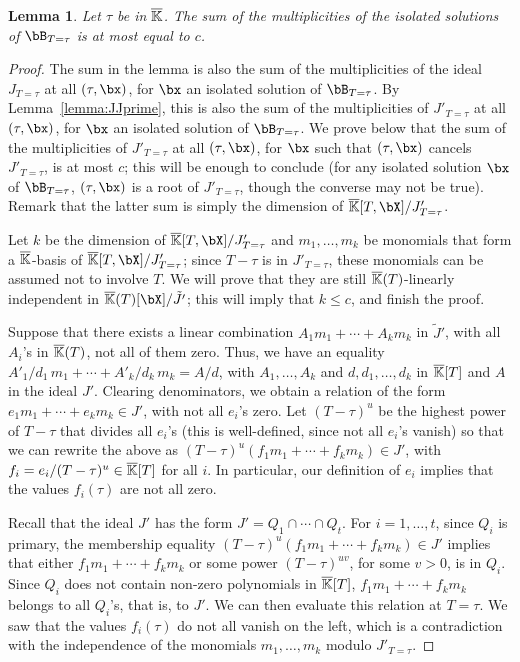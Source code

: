 \documentclass[12pt]{article}
\newtheorem{lemma}[definition]{Lemma}
\begin{document}
 
\begin{lemma}\label{lemma:19}
  Let $\tau$ be in $\overline{\mathbb{K}}$. The sum of the multiplicities of the
  isolated solutions of $\bB_{T=\tau}$ is at most equal to $c$.
\end{lemma}
\begin{proof}
  The sum in the lemma is also the sum of the multiplicities of the
  ideal $J_{T=\tau}$ at all $(\tau,\bx)$, for $\bx$ an isolated solution
  of $\bB_{T=\tau}$.  By Lemma~\ref{lemma:JJprime}, this is also the sum
  of the multiplicities of $J'_{T=\tau}$ at all $(\tau,\bx)$, for $\bx$ an
  isolated solution of $\bB_{T=\tau}$. We prove below that the sum of the
  multiplicities of $J'_{T=\tau}$ at all $(\tau,\bx)$, for $\bx$ such that
  $(\tau,\bx)$ cancels $J'_{T=\tau}$, is at most $c$; this will be enough
  to conclude (for any isolated solution $\bx$ of $\bB_{T=\tau}$,
  $(\tau,\bx)$ is a root of $J'_{T=\tau}$, though the converse may not be
  true). Remark that the latter sum is simply the dimension of
  $\KKbar[T,\bX]/J'_{T=\tau}$.
  
  Let $k$ be the dimension of $\KKbar[T,\bX]/J'_{T=\tau}$ and $m_1,\dots,m_k$ be
  monomials that form a $\overline{\mathbb{K}}$-basis of $\KKbar[T,\bX]/J'_{T=\tau}$; since
  $T-\tau$ is in $J'_{T=\tau}$, these monomials can be assumed not to involve
  $T$. We will prove that they are still $\overline{\mathbb{K}}(T)$-linearly independent in
  $\KKbar(T)[\bX]/\tilde{J'}$; this will imply that $k \le c$, and finish the
  proof.
  
  Suppose that there exists a linear combination $A_1 m_1 + \cdots +
  A_k m_k$ in $\tilde{J}'$, with all $A_i$'s in $\overline{\mathbb{K}}(T)$, not
  all of them zero. Thus, we have an equality $A'_1/d_1\, m_1 + \cdots
  + A'_k/d_k\, m_k = A/d$, with $A_1,\dots,A_k$ and
  $d,d_1,\dots,d_k$ in $\overline{\mathbb{K}}[T]$ and $A$ in the ideal
  $J'$. Clearing denominators, we obtain a relation of the form $e_1
  m_1 +\cdots+ e_k m_k \in J'$, with not all $e_i$'s zero. Let
  $(T-\tau)^u$ be the highest power of $T-\tau$ that divides all
  $e_i$'s (this is well-defined, since not all $e_i$'s vanish) so that
  we can rewrite the above as $(T-\tau)^u (f_1 m_1 +\cdots+ f_k
  m_k) \in J'$, with $f_i=e_i/(T-\tau)^u \in \overline{\mathbb{K}}[T]$ for all $i$.
  In particular, our definition of $e_i$ implies that the values
  $f_i(\tau)$ are not all zero.

  Recall that the ideal $J'$ has the form $J'=Q_1 \cap \cdots \cap
  Q_t$. For $i=1,\dots,t$, since $Q_i$ is primary, the membership
  equality $(T-\tau)^u (f_1 m_1 +\cdots +f_k m_k) \in J'$ implies
  that either $f_1 m_1 +\cdots +f_k m_k$ or some power
  $(T-\tau)^{uv}$, for some $v > 0$, is in $Q_i$. Since $Q_i$ does not
  contain non-zero polynomials in $\overline{\mathbb{K}}[T]$, $f_1 m_1 +\cdots+ f_k
  m_k$ belongs to all $Q_i$'s, that is, to $J'$. We can then
  evaluate this relation at $T=\tau$. We saw that the values
  $f_i(\tau)$ do not all vanish on the left, which is a contradiction
  with the independence of the monomials $m_1,\dots,m_k$ modulo
  $J'_{T=\tau}$.
\end{proof}
\end{document}
